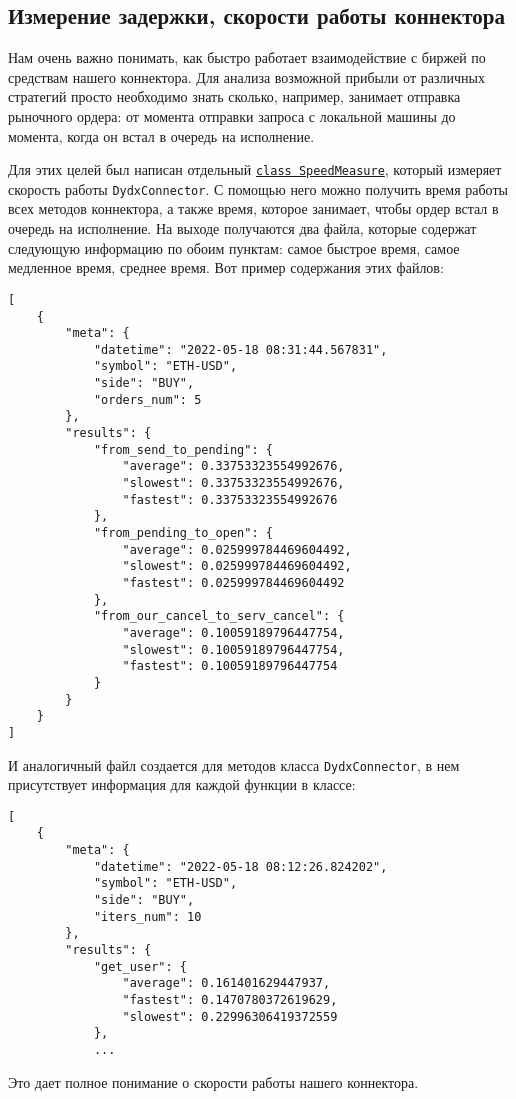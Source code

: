 \subsection{Измерение задержки, скорости работы коннектора}

Нам очень важно понимать, как быстро работает взаимодействие с биржей по средствам нашего коннектора. Для анализа возможной прибыли от различных стратегий просто необходимо знать сколько, например, занимает отправка рыночного ордера: от момента отправки запроса с локальной машины до момента, когда он встал в очередь на исполнение.

Для этих целей был написан отдельный \href{https://github.com/dexety/dex-trading-system/blob/90a2ccd08234584b2ab9a274fe82533a55b924d9/utils/dydx_delay_measurer.py#L15}{\texttt{class SpeedMeasure}}, который измеряет скорость работы \texttt{DydxConnector}.  С помощью него можно получить время работы всех методов коннектора, а также время, которое занимает, чтобы ордер встал в очередь на исполнение. На выходе получаются два файла, которые содержат следующую информацию по обоим пунктам: самое быстрое время, самое медленное время, среднее время. Вот пример содержания этих файлов:

\begin{verbatim}
[
    {
        "meta": {
            "datetime": "2022-05-18 08:31:44.567831",
            "symbol": "ETH-USD",
            "side": "BUY",
            "orders_num": 5
        },
        "results": {
            "from_send_to_pending": {
                "average": 0.33753323554992676,
                "slowest": 0.33753323554992676,
                "fastest": 0.33753323554992676
            },
            "from_pending_to_open": {
                "average": 0.025999784469604492,
                "slowest": 0.025999784469604492,
                "fastest": 0.025999784469604492
            },
            "from_our_cancel_to_serv_cancel": {
                "average": 0.10059189796447754,
                "slowest": 0.10059189796447754,
                "fastest": 0.10059189796447754
            }
        }
    }
]
\end{verbatim}
И аналогичный файл создается для методов класса \texttt{DydxConnector}, в нем присутствует информация для каждой функции в классе:
\begin{verbatim}
[
    {
        "meta": {
            "datetime": "2022-05-18 08:12:26.824202",
            "symbol": "ETH-USD",
            "side": "BUY",
            "iters_num": 10
        },
        "results": {
            "get_user": {
                "average": 0.161401629447937,
                "fastest": 0.1470780372619629,
                "slowest": 0.22996306419372559
            },
            ...
\end{verbatim}
Это дает полное понимание о скорости работы нашего коннектора.

